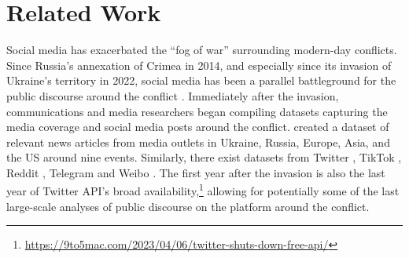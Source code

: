 \section{Related Work}



Social media has exacerbated the ``fog of war'' surrounding modern-day conflicts.
Since Russia's annexation of Crimea in 2014, and especially since its invasion of Ukraine's territory in 2022, social media has been a parallel battleground for the public discourse around the conflict \cite{freeman2023seeing}. 
Immediately after the invasion, communications and media researchers began compiling datasets capturing the media coverage and social media posts around the conflict.
\citet{khairova2023first} created a dataset of relevant news articles from media outlets in Ukraine, Russia, Europe, Asia, and the US around nine events. 
Similarly, there exist datasets from Twitter \cite{chen2023tweets,pohl2023invasion}, TikTok \cite{primig2023remixing}, Reddit \cite{albota2022war}, Telegram \cite{ronzhyn2023collective} and Weibo \cite{hanley2023special}.
The first year after the invasion is also the last year of Twitter API's broad availability,\footnote{\url{https://9to5mac.com/2023/04/06/twitter-shuts-down-free-api/}} allowing for potentially some of the last large-scale analyses of public discourse on the platform around the conflict. 


